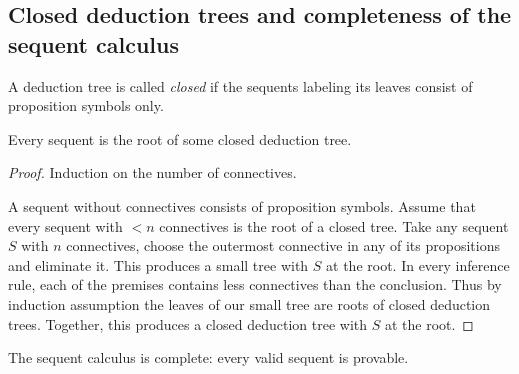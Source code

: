 \begin{page}

\subsection{Closed deduction trees and completeness of the sequent calculus}

\end{page}

\begin{page}

\begin{dfn}
A deduction tree is called \emph{closed} if the sequents labeling its leaves consist of proposition symbols only.
\end{dfn}

\end{page}

\begin{page}

\begin{lem}
Every sequent is the root of some closed deduction tree.
\end{lem}

\end{page}

\begin{page}

\begin{proof}
Induction on the number of connectives.

A sequent without connectives consists of proposition symbols.
Assume that every sequent with $< n$ connectives is the root of a closed tree.
Take any sequent $S$ with $n$ connectives, choose the outermost connective in any of its propositions and eliminate it.
This produces a small tree with $S$ at the root.
In every inference rule, each of the premises contains less connectives than the conclusion.
Thus by induction assumption the leaves of our small tree are roots of closed deduction trees.
Together, this produces a closed deduction tree with $S$ at the root.
\end{proof}


\end{page}

\begin{page}

\begin{thm}
The sequent calculus is complete: every valid sequent is provable.
\end{thm}

\end{page}

